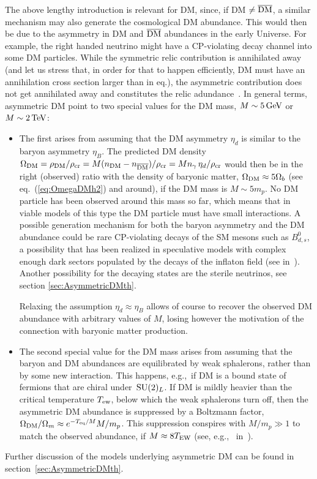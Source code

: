 \bigskip

The above lengthy introduction is relevant for DM, 
since, if DM $\neq\overline{\rm DM}$, a similar mechanism may also
generate the cosmological DM abundance. This would then be due to the asymmetry in DM and $\overline{\rm DM}$ abundances in the early Universe. For example, the right handed neutrino might have a CP-violating decay channel into some DM particles. 
While the symmetric relic contribution is annihilated away (and let us stress that, in order for that to happen efficiently, DM must have an annihilation cross section larger than in eq.), the asymmetric contribution does not get annihilated away and constitutes the relic adundance~\cite{AsymmetricDM}.
In general terms, asymmetric DM point to two special values for the DM mass, $M \sim 5\,{\rm GeV}$ or $M \sim 2 \,{\rm TeV}$:
\begin{itemize}
\item[$\blacktriangleleft$] The first arises from assuming that the DM asymmetry $\eta_d$ is similar to the baryon asymmetry $\eta_B$.
The predicted DM density $\Omega_{\rm DM} = \rho_{\rm DM}/\rho_{\rm cr} = M(n_{\rm DM}-n_{\overline{\rm DM}})/\rho_{\rm cr} = M n_\gamma \, \eta_d /\rho_{\rm cr}$ would then be in the right (observed) ratio with the density of baryonic matter, 
$\Omega_{\rm DM}\approx 5 \Omega_b$ (see eq.~(\ref{eq:OmegaDMh2}) and around), if the DM mass is $M\sim 5 m_p$.
No DM particle has been observed around this mass so far, which means that in viable models of this type the DM particle must have small interactions.
A possible generation mechanism for both the baryon asymmetry and the DM abundance 
could be rare
CP-violating decays of the SM mesons such as $B^0_{d,s}$,
a possibility that has been realized in speculative models with complex enough dark sectors populated by the decays of
the inflaton field (see  in~\cite{AsymmetricDM}). Another possibility for the decaying states are the sterile neutrinos, see section \ref{sec:AsymmetricDMth}.

Relaxing the assumption $\eta_d \approx \eta_B$ allows of course to recover the observed DM abundance with arbitrary values of $M$, losing however the motivation of the connection with baryonic matter production. 


\item[$\blacktriangleright$] The second special value for the DM mass 
arises from assuming that the baryon and DM abundances
are equilibrated by weak sphalerons, rather than by some new interaction.
This happens, e.g.,\ if DM is a bound state of fermions that are chiral under $\,{\rm SU}(2)_L$.
If DM is mildly heavier than the critical temperature $T_{\rm ew}$, below which the
weak sphalerons turn off, 
then the asymmetric DM abundance is suppressed by a Boltzmann factor,
$\Omega_{\rm DM}/\Omega_m \approx e^{-T_{\rm eq}/M} M/m_p$.
This suppression conspires with $M/m_p\gg 1$ to match the observed abundance, if $M \approx 8 T_{\rm EW}$
(see, e.g.,~ in~\cite{positronexcess}).

\end{itemize}
Further discussion of the models underlying asymmetric DM can be found in section~\ref{sec:AsymmetricDMth}.

